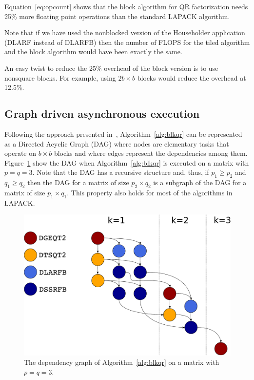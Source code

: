\documentclass[runningheads]{llncs}
\begin{document}
Equation~\eqref{eq:opcount} shows that the block algorithm for QR
factorization needs 25\% more floating point operations than the
standard LAPACK algorithm.

Note that if we have used the nonblocked version of the Householder application
(DLARF instead of DLARFB) then the number of FLOPS for the tiled algorithm
and the block algorithm would have been exactly the same.

An easy twist to reduce the 25\% overhead of the block version is to use nonsquare
blocks. For example, using $2b\times b$ blocks would reduce the overhead at 12.5\%.

\subsection{Graph driven asynchronous execution}

Following the approach presented in~\cite{Kurzak:2006:ILA,para06},
Algorithm~\ref{alg:blkqr} can be represented as a Directed Acyclic
Graph (DAG) where nodes are elementary tasks that operate on
$b \times b$ blocks and where edges represent the dependencies among
them. Figure~\ref{fig:qr_dag} show the DAG when
Algorithm~\ref{alg:blkqr} is executed on a matrix with $p=q=3$. Note
that the DAG has a recursive structure and, thus, if $p_1 \ge p_2$ and
$q_1 \ge q_2$ then the DAG for a matrix of size $p_2 \times q_2$ is
a subgraph of the DAG for a matrix of size $p_1 \times q_1$. This
property also holds for most of the algorithms in LAPACK.

\begin{figure}[!h]
  \begin{center}
    \includegraphics[width=\textwidth]{images/qr_dag_3x3_color.pdf}
  \caption{\label{fig:qr_dag}The dependency graph of
    Algorithm~\ref{alg:blkqr} on a matrix with $p=q=3$.}
  \end{center}
\end{figure}
\end{document}
